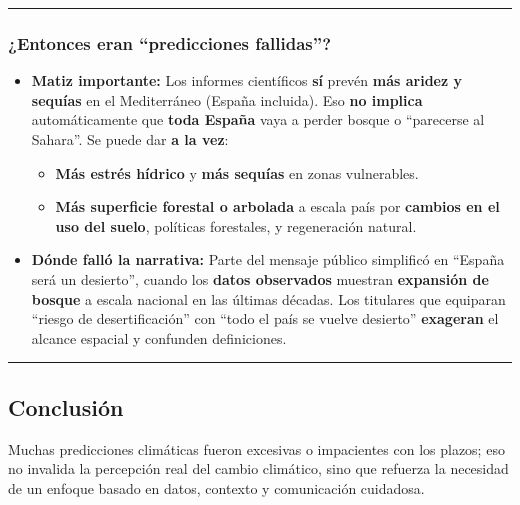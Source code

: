 \documentclass[
  10pt,
  a4paper,
  DIV=11,
  numbers=noendperiod,
  open=any]{scrreprt}
\providecommand{\tightlist}{%
  \setlength{\itemsep}{0pt}\setlength{\parskip}{0pt}}
\numberwithin{equation}{chapter}
\numberwithin{equation}{section}
\renewcommand{\[}{\begin{equation}}
\renewcommand{\]}{\end{equation}}
\begin{document}
\begin{center}\rule{0.5\linewidth}{0.5pt}\end{center}

\subsubsection{¿Entonces eran ``predicciones
fallidas''?}\label{entonces-eran-predicciones-fallidas}

\begin{itemize}
\tightlist
\item
  \textbf{Matiz importante:} Los informes científicos \textbf{sí} prevén
  \textbf{más aridez y sequías} en el Mediterráneo (España incluida).
  Eso \textbf{no implica} automáticamente que \textbf{toda España} vaya
  a perder bosque o ``parecerse al Sahara''. Se puede dar \textbf{a la
  vez}:

  \begin{itemize}
  \tightlist
  \item
    \textbf{Más estrés hídrico} y \textbf{más sequías} en zonas
    vulnerables.\\
  \item
    \textbf{Más superficie forestal o arbolada} a escala país por
    \textbf{cambios en el uso del suelo}, políticas forestales, y
    regeneración natural.
  \end{itemize}
\item
  \textbf{Dónde falló la narrativa:} Parte del mensaje público
  simplificó en ``España será un desierto'', cuando los \textbf{datos
  observados} muestran \textbf{expansión de bosque} a escala nacional en
  las últimas décadas. Los titulares que equiparan ``riesgo de
  desertificación'' con ``todo el país se vuelve desierto''
  \textbf{exageran} el alcance espacial y confunden definiciones.
\end{itemize}

\begin{center}\rule{0.5\linewidth}{0.5pt}\end{center}

\subsection{Conclusión}\label{conclusiuxf3n}

Muchas predicciones climáticas fueron excesivas o impacientes con los
plazos; eso no invalida la percepción real del cambio climático, sino
que refuerza la necesidad de un enfoque basado en datos, contexto y
comunicación cuidadosa.
\end{document}
